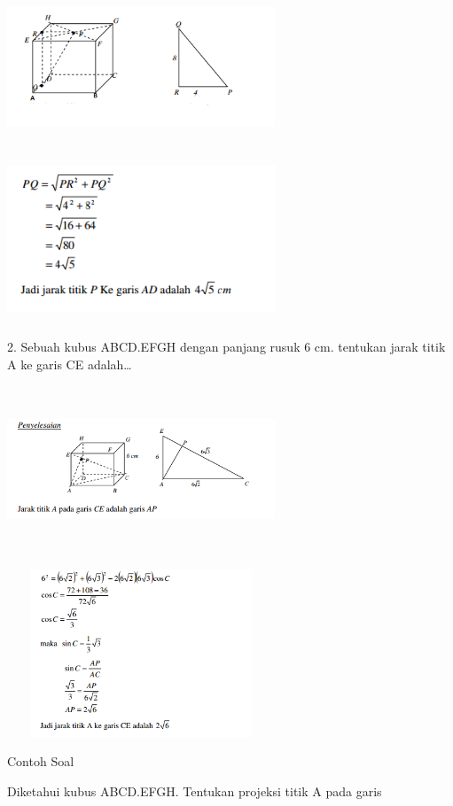 \documentclass[11pt,fleqn]{book} %
\begin{document}
\includegraphics[width = 8cm, height= 5cm]{Pictures/gi2.png}
\includegraphics[width = 8cm, height= 5cm]{Pictures/gi3.png}

2. Sebuah kubus ABCD.EFGH dengan panjang rusuk 6 cm. tentukan jarak titik A ke
garis CE adalah…

\includegraphics[width = 8cm, height= 5cm]{Pictures/gi4.png}

\includegraphics[width = 8cm, height= 5cm]{Pictures/gi5.png}

Contoh Soal

Diketahui kubus ABCD.EFGH. Tentukan projeksi titik
A pada garis
\end{document}
